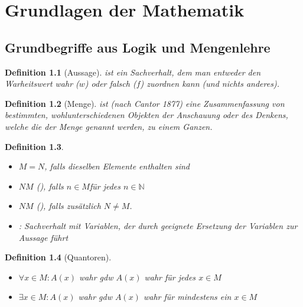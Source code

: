 \documentclass[ngerman,a4paper]{report}
\theoremstyle{break}
\newtheorem*{definition}{Definition}
\begin{document}
	
	
\chapter{Grundlagen der Mathematik}
\section{Grundbegriffe aus Logik und Mengenlehre}

\begin{definition}[Aussage]
	 ist ein Sachverhalt, dem man entweder den Warheitswert wahr ($w$) oder falsch ($f$) zuordnen kann (und nichts anderes).
\end{definition}

\addtocounter{theorem}{1}
	
\begin{definition}[Menge]
	 ist (nach Cantor 1877) eine Zusammenfassung von bestimmten, wohlunterschiedenen Objekten der Anschauung oder des Denkens, welche die  der Menge genannt werden, zu einem Ganzen.
\end{definition}

\addtocounter{theorem}{1}

\begin{definition}
	\begin{itemize}
		\item $M=N$, falls dieselben Elemente enthalten sind
		\item $N$$M$ (), falls $n\in M$für jedes $n\in\mathbb{N}$
		\item $N$$M$ (), falls zusätzlich $N\neq M$.
		\item {}: Sachverhalt mit Variablen, der durch geeignete Ersetzung der Variablen zur Aussage führt
	\end{itemize}
\end{definition}

\addtocounter{theorem}{1}

\begin{definition}[Quantoren]
	\begin{itemize}
		\item $\forall x\in M: A(x)$ wahr \gls{gdw} $A(x)$ wahr für jedes $x\in M$
		\item $\exists x\in M: A(x)$ wahr \gls{gdw} $A(x)$ wahr für mindestens ein $x\in M$
	\end{itemize}
\end{definition}
\end{document}
